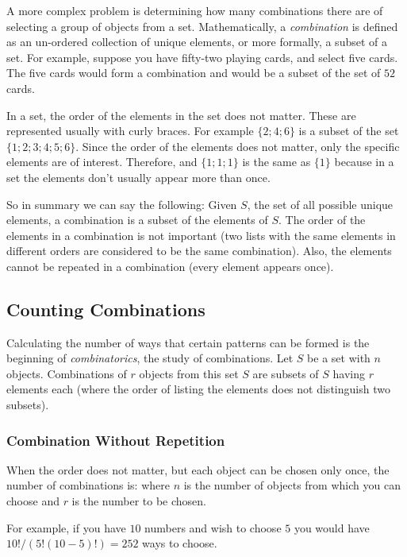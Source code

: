 A more complex problem is determining how many combinations there are of selecting a group of objects from a set. Mathematically, a \textit{combination} is defined as an un-ordered collection of unique elements, or more formally, a subset of a set. For example, suppose you have fifty-two playing cards, and select five cards. The five cards would form a combination and would be a subset of the set of $52$ cards.

In a set, the order of the elements in the set does not matter. These are represented usually with curly braces. For example $\{2; 4; 6\}$ is a subset of the set $\{1; 2; 3; 4; 5; 6\}$. Since the order of the elements does not matter, only the specific elements are of interest. Therefore,
and $\{1; 1; 1\}$ is the same as $\{1\}$ because in a set the elements don't usually appear more than once.

So in summary we can say the following:
Given $S$, the set of all possible unique elements, a combination is a subset of the elements of $S$. The order of the elements in a combination is not important (two lists with the same elements in different orders are considered to be the same combination). Also, the elements cannot be repeated in a combination (every element appears once).

\subsection{Counting Combinations}
Calculating the number of ways that certain patterns can be formed is the beginning of \mbox{\textit{combinatorics}}, the study of combinations. Let $S$ be a set with $n$ objects. Combinations of $r$ objects from this set $S$ are subsets of $S$ having $r$ elements each (where the order of listing the elements does not distinguish two subsets).

\subsubsection{Combination Without Repetition}

When the order does not matter, but each object can be chosen only once, the number of combinations is:
where $n$ is the number of objects from which you can choose and $r$ is the number to be chosen.

For example, if you have $10$ numbers and wish to choose $5$ you would have $10!/(5!(10 - 5)!) = 252$ ways to choose.

